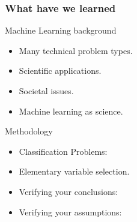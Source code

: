 \begin{frame}
  \frametitle{What have we learned}
  \begin{block}{Machine Learning background}
    \begin{itemize}
    \item Many \alert{technical} problem types.
    \item \alert{Scientific} applications.
    \item \alert{Societal} issues.
    \item Machine learning as science.
    \end{itemize}
  \end{block}

  \begin{block}{Methodology}
    \begin{itemize}
    \item \alert{Classification} Problems: 
    \item Elementary \alert{variable selection}.
    \item \alert{Verifying} your \alert{conclusions}: 
    \item Verifying your \alert{assumptions}: 
    \end{itemize}
  \end{block}
\end{frame}








